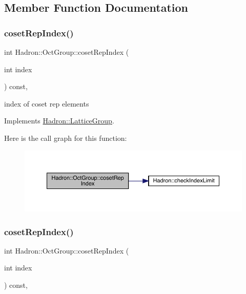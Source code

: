 \subsection{Member Function Documentation}
\mbox{\label{structHadron_1_1OctGroup_aeaabc93ad3df1b585bc1009b0bf4f5ba}} 
\subsubsection{\texorpdfstring{cosetRepIndex()}{cosetRepIndex()}\hspace{0.1cm}{\footnotesize\ttfamily [1/2]}}
{\footnotesize\ttfamily int Hadron\+::\+Oct\+Group\+::coset\+Rep\+Index (\begin{DoxyParamCaption}\item[{int}]{index }\end{DoxyParamCaption}) const\hspace{0.3cm}{\ttfamily [inline]}, {\ttfamily [virtual]}}

index of coset rep elements 

Implements \mbox{\hyperlink{structHadron_1_1LatticeGroup_a7e3b9b5e2f596e6c40d64aa939a3ad6c}{Hadron\+::\+Lattice\+Group}}.

Here is the call graph for this function\+:
\nopagebreak
\begin{figure}[H]
\begin{center}
\leavevmode
\includegraphics[width=350pt]{d1/de5/structHadron_1_1OctGroup_aeaabc93ad3df1b585bc1009b0bf4f5ba_cgraph}
\end{center}
\end{figure}
\mbox{\label{structHadron_1_1OctGroup_aeaabc93ad3df1b585bc1009b0bf4f5ba}} 
\subsubsection{\texorpdfstring{cosetRepIndex()}{cosetRepIndex()}\hspace{0.1cm}{\footnotesize\ttfamily [2/2]}}
{\footnotesize\ttfamily int Hadron\+::\+Oct\+Group\+::coset\+Rep\+Index (\begin{DoxyParamCaption}\item[{int}]{index }\end{DoxyParamCaption}) const\hspace{0.3cm}{\ttfamily [inline]}, {\ttfamily [virtual]}}

